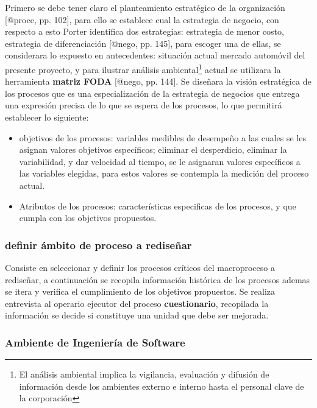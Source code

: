 \documentclass[
]{article}
\providecommand{\tightlist}{%
  \setlength{\itemsep}{0pt}\setlength{\parskip}{0pt}}
\begin{document}
Primero se debe tener claro el planteamiento estratégico de la
organización {[}@proce, pp. 102{]}, para ello se establece cual la
estrategia de negocio, con respecto a esto Porter identifica dos
estrategias: estrategia de menor costo, estrategia de diferenciación
{[}@nego, pp. 145{]}, para escoger una de ellas, se considerara lo
expuesto en antecedentes: situación actual mercado automóvil del
presente proyecto, y para ilustrar análisis ambiental\footnote{El
  análisis ambiental implica la vigilancia, evaluación y difusión de
  información desde los ambientes externo e interno hasta el personal
  clave de la corporación} actual se utilizara la herramienta
\textbf{matriz FODA} {[}@nego, pp. 144{]}. Se diseñara la visión
estratégica de los procesos que es una especialización de la estrategia
de negocios que entrega una expresión precisa de lo que se espera de los
procesos, lo que permitirá establecer lo siguiente:

\begin{itemize}
\tightlist
\item
  objetivos de los procesos: variables medibles de desempeño a las
  cuales se les asignan valores objetivos específicos; eliminar el
  desperdicio, eliminar la variabilidad, y dar velocidad al tiempo, se
  le asignaran valores específicos a las variables elegidas, para estos
  valores se contempla la medición del proceso actual.
\item
  Atributos de los procesos: características especificas de los
  procesos, y que cumpla con los objetivos propuestos.
\end{itemize}

\hypertarget{definir-uxe1mbito-de-proceso-a-rediseuxf1ar}{%
\subsubsection{definir ámbito de proceso a
rediseñar}\label{definir-uxe1mbito-de-proceso-a-rediseuxf1ar}}

Consiste en seleccionar y definir los procesos críticos del macroproceso
a rediseñar, a continuación se recopila información histórica de los
procesos ademas se itera y verifica el cumplimiento de los objetivos
propuestos. Se realiza entrevista al operario ejecutor del proceso
\textbf{cuestionario}, recopilada la información se decide si constituye
una unidad que debe ser mejorada.

\hypertarget{ambiente-de-ingenieruxeda-de-software}{%
\subsubsection{Ambiente de Ingeniería de
Software}\label{ambiente-de-ingenieruxeda-de-software}}
\end{document}

